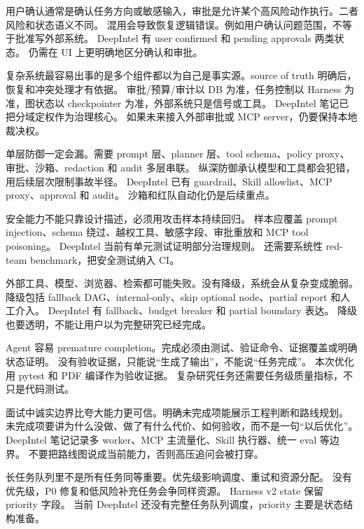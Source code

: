 {用户确认通常是确认任务方向或敏感输入，审批是允许某个高风险动作执行。二者风险和状态语义不同。}
{混用会导致恢复逻辑错误。例如用户确认问题范围，不等于批准写外部系统。}
{DeepIntel 有 user confirmed 和 pending approvals 两类状态。}
{仍需在 UI 上更明确地区分确认和审批。}

{复杂系统最容易出事的是多个组件都以为自己是事实源。source of truth 明确后，恢复和冲突处理才有依据。}
{审批/预算/审计以 DB 为准，任务控制以 Harness 为准，图状态以 checkpointer 为准，外部系统只是信号或工具。}
{DeepIntel 笔记已把分域定权作为治理核心。}
{如果未来接入外部审批或 MCP server，仍要保持本地裁决权。}

{单层防御一定会漏。需要 prompt 层、planner 层、tool schema、policy proxy、审批、沙箱、redaction 和 audit 多层串联。}
{纵深防御承认模型和工具都会犯错，用后续层次限制事故半径。}
{DeepIntel 已有 guardrail、Skill allowlist、MCP proxy、approval 和 audit。}
{沙箱和红队自动化仍是后续重点。}

{安全能力不能只靠设计描述，必须用攻击样本持续回归。}
{样本应覆盖 prompt injection、schema 绕过、越权工具、敏感字段、审批重放和 MCP tool poisoning。}
{DeepIntel 当前有单元测试证明部分治理规则。}
{还需要系统性 red-team benchmark，把安全测试纳入 CI。}

{外部工具、模型、浏览器、检索都可能失败。没有降级，系统会从复杂变成脆弱。}
{降级包括 fallback DAG、internal-only、skip optional node、partial report 和人工介入。}
{DeepIntel 有 fallback、budget breaker 和 partial boundary 表达。}
{降级也要透明，不能让用户以为完整研究已经完成。}

{Agent 容易 premature completion。完成必须由测试、验证命令、证据覆盖或明确状态证明。}
{没有验收证据，只能说“生成了输出”，不能说“任务完成”。}
{本次优化用 pytest 和 PDF 编译作为验收证据。}
{复杂研究任务还需要任务级质量指标，不只是代码测试。}

{面试中诚实边界比夸大能力更可信。明确未完成项能展示工程判断和路线规划。}
{未完成项要讲为什么没做、做了有什么代价、如何验收，而不是一句“以后优化”。}
{DeepIntel 笔记记录多 worker、MCP 主流量化、Skill 执行器、统一 eval 等边界。}
{不要把路线图说成当前能力，否则高压追问会被打穿。}

{长任务队列里不是所有任务同等重要。优先级影响调度、重试和资源分配。}
{没有优先级，P0 修复和低风险补充任务会争同样资源。}
{Harness v2 state 保留 priority 字段。}
{当前 DeepIntel 还没有完整任务队列调度，priority 主要是状态结构准备。}

